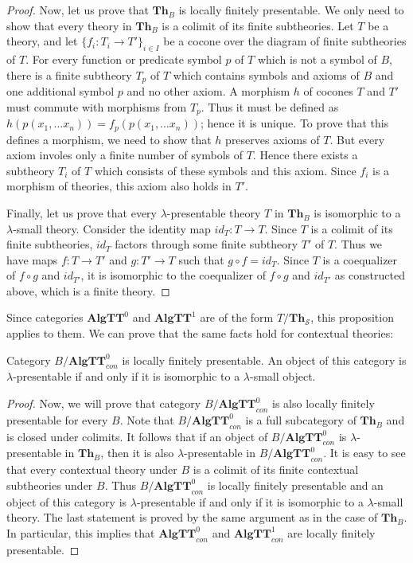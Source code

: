 \documentclass[reqno]{amsart}
\theoremstyle{definition}
\theoremstyle{remark}
\newcommand{\cat}[1]{\mathbf{#1}}
\newcommand{\Th}{\cat{Th}}
\newcommand{\algtt}{\cat{AlgTT}}
\numberwithin{figure}{section}
\begin{document}
\begin{proof}
Now, let us prove that $\Th_B$ is locally finitely presentable.
We only need to show that every theory in $\Th_B$ is a colimit of its finite subtheories.
Let $T$ be a theory, and let $\{ f_i : T_i \to T' \}_{i \in I}$ be a cocone over the diagram of finite subtheories of $T$.
For every function or predicate symbol $p$ of $T$ which is not a symbol of $B$, there is a finite subtheory $T_p$ of $T$ which contains symbols and axioms of $B$ and one additional symbol $p$ and no other axiom.
A morphism $h$ of cocones $T$ and $T'$ must commute with morphisms from $T_p$.
Thus it must be defined as $h(p(x_1, \ldots x_n)) = f_p(p(x_1, \ldots x_n))$; hence it is unique.
To prove that this defines a morphism, we need to show that $h$ preserves axioms of $T$.
But every axiom involes only a finite number of symbols of $T$.
Hence there exists a subtheory $T_i$ of $T$ which consists of these symbols and this axiom.
Since $f_i$ is a morphism of theories, this axiom also holds in $T'$.

Finally, let us prove that every $\lambda$-presentable theory $T$ in $\Th_B$ is isomorphic to a $\lambda$-small theory.
Consider the identity map $id_T : T \to T$.
Since $T$ is a colimit of its finite subtheories, $id_T$ factors through some finite subtheory $T'$ of $T$.
Thus we have maps $f : T \to T'$ and $g : T' \to T$ such that $g \circ f = id_T$.
Since $T$ is a coequalizer of $f \circ g$ and $id_{T'}$, it is isomorphic to the coequalizer of $f \circ g$ and $id_{T'}$ as constructed above, which is a finite theory.
\end{proof}

Since categories $\algtt^0$ and $\algtt^1$ are of the form $T/\Th_\mathcal{S}$, this proposition applies to them.
We can prove that the same facts hold for contextual theories:

\begin{cor}
Category $B/\algtt^0_{con}$ is locally finitely presentable.
An object of this category is $\lambda$-presentable if and only if it is isomorphic to a $\lambda$-small object.
\end{cor}
\begin{proof}
Now, we will prove that category $B/\algtt^0_{con}$ is also locally finitely presentable for every $B$.
Note that $B/\algtt^0_{con}$ is a full subcategory of $\Th_B$ and is closed under colimits.
It follows that if an object of $B/\algtt^0_{con}$ is $\lambda$-presentable in $\Th_B$, then it is also $\lambda$-presentable in $B/\algtt^0_{con}$.
It is easy to see that every contextual theory under $B$ is a colimit of its finite contextual subtheories under $B$.
Thus $B/\algtt^0_{con}$ is locally finitely presentable and an object of this category is $\lambda$-presentable if and only if it is isomorphic to a $\lambda$-small theory.
The last statement is proved by the same argument as in the case of $\Th_B$.
In particular, this implies that $\algtt^0_{con}$ and $\algtt^1_{con}$ are locally finitely presentable.
\end{proof}
\end{document}
